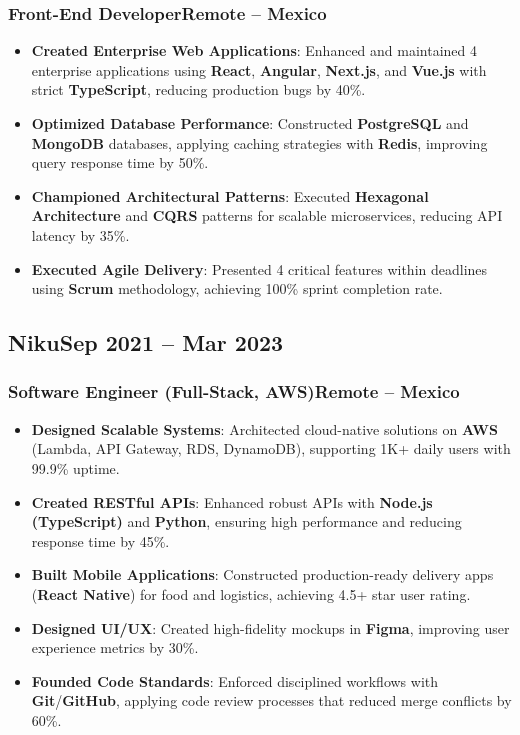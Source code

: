 \documentclass[a4paper,10pt]{article}
\newcommand{\kw}[1]{\textbf{\textcolor{keyword}{#1}}}
\newcommand{\tech}[1]{\textbf{\textcolor{tech}{#1}}}
\begin{document}
\subsubsection*{\small Front-End Developer\hfill Remote -- Mexico}
\begin{itemize}[noitemsep, leftmargin=*]
    \item \textbf{Created Enterprise Web Applications}: Enhanced and maintained 4 enterprise applications using \tech{React}, \tech{Angular}, \tech{Next.js}, and \tech{Vue.js} with strict \tech{TypeScript}, reducing production bugs by 40\%.
    \item \textbf{Optimized Database Performance}: Constructed \kw{PostgreSQL} and \kw{MongoDB} databases, applying caching strategies with \tech{Redis}, improving query response time by 50\%.
    \item \textbf{Championed Architectural Patterns}: Executed \kw{Hexagonal Architecture} and \kw{CQRS} patterns for scalable microservices, reducing API latency by 35\%.
    \item \textbf{Executed Agile Delivery}: Presented 4 critical features within deadlines using \kw{Scrum} methodology, achieving 100\% sprint completion rate.
\end{itemize}

\subsection*{\small Niku\hfill\textbf{Sep 2021 -- Mar 2023}}
\subsubsection*{\small Software Engineer (Full-Stack, AWS)\hfill Remote -- Mexico}
\begin{itemize}[noitemsep, leftmargin=*]
    \item \textbf{Designed Scalable Systems}: Architected cloud-native solutions on \tech{AWS} (Lambda, API Gateway, RDS, DynamoDB), supporting 1K+ daily users with 99.9\% uptime.
    \item \textbf{Created RESTful APIs}: Enhanced robust APIs with \tech{Node.js (TypeScript)} and \tech{Python}, ensuring high performance and reducing response time by 45\%.
    \item \textbf{Built Mobile Applications}: Constructed production-ready delivery apps (\tech{React Native}) for food and logistics, achieving 4.5+ star user rating.
    \item \textbf{Designed UI/UX}: Created high-fidelity mockups in \tech{Figma}, improving user experience metrics by 30\%.
    \item \textbf{Founded Code Standards}: Enforced disciplined workflows with \tech{Git}/\tech{GitHub}, applying code review processes that reduced merge conflicts by 60\%.
\end{itemize}
\end{document}
